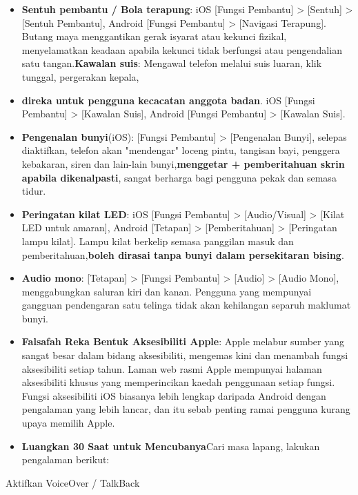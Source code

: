 \begin{itemize}
  \item \textbf{Sentuh pembantu / Bola terapung}: iOS [Fungsi Pembantu] > [Sentuh] > [Sentuh Pembantu], Android [Fungsi Pembantu] > [Navigasi Terapung]. Butang maya menggantikan gerak isyarat atau kekunci fizikal, menyelamatkan keadaan apabila kekunci tidak berfungsi atau pengendalian satu tangan.\textbf{Kawalan suis}: Mengawal telefon melalui suis luaran, klik tunggal, pergerakan kepala,
  \item \textbf{direka untuk pengguna kecacatan anggota badan}. iOS [Fungsi Pembantu] > [Kawalan Suis], Android [Fungsi Pembantu] > [Kawalan Suis].
  \item \textbf{Pengenalan bunyi}(iOS): [Fungsi Pembantu] > [Pengenalan Bunyi], selepas diaktifkan, telefon akan "mendengar" loceng pintu, tangisan bayi, penggera kebakaran, siren dan lain-lain bunyi,\textbf{menggetar + pemberitahuan skrin apabila dikenalpasti}, sangat berharga bagi pengguna pekak dan semasa tidur.
  \item \textbf{Peringatan kilat LED}: iOS [Fungsi Pembantu] > [Audio/Visual] > [Kilat LED untuk amaran], Android [Tetapan] > [Pemberitahuan] > [Peringatan lampu kilat]. Lampu kilat berkelip semasa panggilan masuk dan pemberitahuan,\textbf{boleh dirasai tanpa bunyi dalam persekitaran bising}.
  \item \textbf{Audio mono}: [Tetapan] > [Fungsi Pembantu] > [Audio] > [Audio Mono], menggabungkan saluran kiri dan kanan. Pengguna yang mempunyai gangguan pendengaran satu telinga tidak akan kehilangan separuh maklumat bunyi.
  \item \textbf{Falsafah Reka Bentuk Aksesibiliti Apple}: Apple melabur sumber yang sangat besar dalam bidang aksesibiliti, mengemas kini dan menambah fungsi aksesibiliti setiap tahun. Laman web rasmi Apple mempunyai halaman aksesibiliti khusus yang memperincikan kaedah penggunaan setiap fungsi. Fungsi aksesibiliti iOS biasanya lebih lengkap daripada Android dengan pengalaman yang lebih lancar, dan itu sebab penting ramai pengguna kurang upaya memilih Apple.
  \item \textbf{Luangkan 30 Saat untuk Mencubanya}Cari masa lapang, lakukan pengalaman berikut:
\end{itemize}

\begin{tcbinfo}{Aktifkan}
VoiceOver / TalkBack

\end{tcbinfo}

